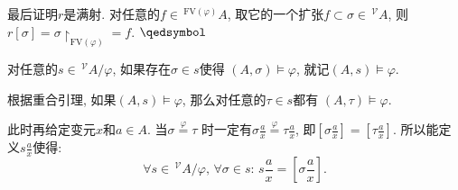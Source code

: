 最后证明$r$是满射. 对任意的$f\in\,\!^{\mathrm{FV}(\varphi)}A$,
取它的一个扩张$f\subset\sigma\in\,\!^{\mathcal{V}}\!A$,
则$r[\sigma]=\sigma\!\restriction_{\mathrm{FV}(\varphi)}=f$. \hfill $\qedsymbol$

\vspace{10pt}

对任意的$s\in\,\!^{\mathcal{V}}\!A/\varphi$, 如果存在$\sigma\in s$使得
$(A,\sigma)\models\varphi$, 就记$(A,s)\models\varphi$.

根据重合引理, 如果$(A,s)\models\varphi$, 那么对任意的$\tau\in s$都有
$(A,\tau)\models\varphi$.

\vspace{10pt}

此时再给定变元$x$和$a\in A$. 当$\sigma\overset{\displaystyle\varphi}{=}\tau$
时一定有$\displaystyle\sigma\frac{a}{x}\overset{\displaystyle\varphi}{=}
\tau\frac{a}{x}$, 即$\displaystyle\left[\sigma\frac{a}{x}\right]=
\left[\tau\frac{a}{x}\right]$. 所以能定义$\displaystyle s\frac{a}{x}$使得:
\vspace{6pt}
\[
    \forall s\in\,\!^{\mathcal{V}}\!A/\varphi,\,\forall\sigma\in s:\,
    s\frac{a}{x}=\left[\sigma\frac{a}{x}\right].
\]

